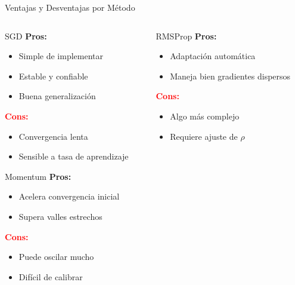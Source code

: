 \documentclass[10pt]{beamer}
\begin{document}
\begin{frame}{Ventajas y Desventajas por Método}
\begin{columns}
\begin{column}{0.5\textwidth}
\begin{block}{SGD}
\textcolor{verdeClaro}{\textbf{Pros:}}
\begin{itemize}
\item Simple de implementar
\item Estable y confiable
\item Buena generalización
\end{itemize}
\textcolor{red}{\textbf{Cons:}}
\begin{itemize}
\item Convergencia lenta
\item Sensible a tasa de aprendizaje
\end{itemize}
\end{block}

\begin{block}{Momentum}
\textcolor{verdeClaro}{\textbf{Pros:}}
\begin{itemize}
\item Acelera convergencia inicial
\item Supera valles estrechos
\end{itemize}
\textcolor{red}{\textbf{Cons:}}
\begin{itemize}
\item Puede oscilar mucho
\item Difícil de calibrar
\end{itemize}
\end{block}
\end{column}

\begin{column}{0.5\textwidth}
\begin{block}{RMSProp}
\textcolor{verdeClaro}{\textbf{Pros:}}
\begin{itemize}
\item Adaptación automática
\item Maneja bien gradientes dispersos
\end{itemize}
\textcolor{red}{\textbf{Cons:}}
\begin{itemize}
\item Algo más complejo
\item Requiere ajuste de $\rho$
\end{itemize}
\end{block}


\end{column}
\end{columns}
\end{frame}
\end{document}
